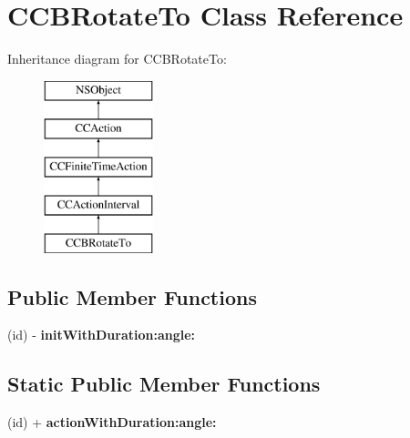 \hypertarget{interface_c_c_b_rotate_to}{\section{C\-C\-B\-Rotate\-To Class Reference}
\label{interface_c_c_b_rotate_to}
}
Inheritance diagram for C\-C\-B\-Rotate\-To\-:\begin{figure}[H]
\begin{center}
\leavevmode
\includegraphics[height=5.000000cm]{interface_c_c_b_rotate_to}
\end{center}
\end{figure}
\subsection*{Public Member Functions}
\begin{DoxyCompactItemize}
\item 
\hypertarget{interface_c_c_b_rotate_to_a5410f0e9ff615469a4d96054be751ad0}{(id) -\/ {\bfseries init\-With\-Duration\-:angle\-:}}\label{interface_c_c_b_rotate_to_a5410f0e9ff615469a4d96054be751ad0}

\end{DoxyCompactItemize}
\subsection*{Static Public Member Functions}
\begin{DoxyCompactItemize}
\item 
\hypertarget{interface_c_c_b_rotate_to_a35590b9fe0077785ac1cede52f6f817b}{(id) + {\bfseries action\-With\-Duration\-:angle\-:}}\label{interface_c_c_b_rotate_to_a35590b9fe0077785ac1cede52f6f817b}

\end{DoxyCompactItemize}
